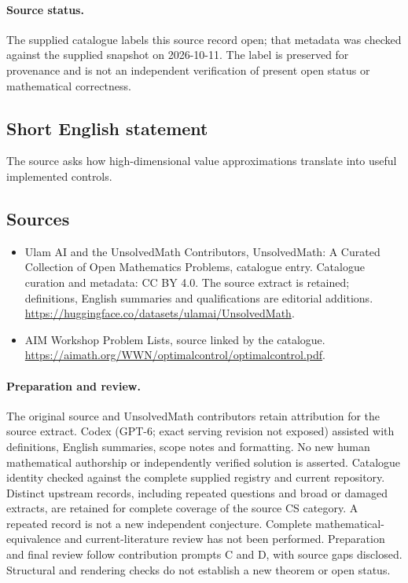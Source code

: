 \documentclass[11pt]{article}
\begin{document}
\paragraph{Source status.}
The supplied catalogue labels this source record open; that metadata was checked against the supplied snapshot on 2026-10-11. The label is preserved for provenance and is not an independent verification of present open status or mathematical correctness.
\subsection{Short English statement}
The source asks how high-dimensional value approximations translate into useful implemented controls.
\subsection{Sources}
\begin{itemize}
\item[\hypertarget{source:statement:1}{S1}] Ulam AI and the UnsolvedMath Contributors, UnsolvedMath: A Curated Collection of Open Mathematics Problems, catalogue entry. Catalogue curation and metadata: CC BY 4.0. The source extract is retained; definitions, English summaries and qualifications are editorial additions.
\url{https://huggingface.co/datasets/ulamai/UnsolvedMath}.
\item[\hypertarget{source:statement:2}{S2}] AIM Workshop Problem Lists, source linked by the catalogue.
\url{https://aimath.org/WWN/optimalcontrol/optimalcontrol.pdf}.
\end{itemize}
\paragraph{Preparation and review.}
The original source and UnsolvedMath contributors retain attribution for the source extract. Codex (GPT-6; exact serving revision not exposed) assisted with definitions, English summaries, scope notes and formatting. No new human mathematical authorship or independently verified solution is asserted. Catalogue identity checked against the complete supplied registry and current repository. Distinct upstream records, including repeated questions and broad or damaged extracts, are retained for complete coverage of the source CS category. A repeated record is not a new independent conjecture. Complete mathematical-equivalence and current-literature review has not been performed. Preparation and final review follow contribution prompts C and D, with source gaps disclosed. Structural and rendering checks do not establish a new theorem or open status.
\label{end:statement}
\end{document}
